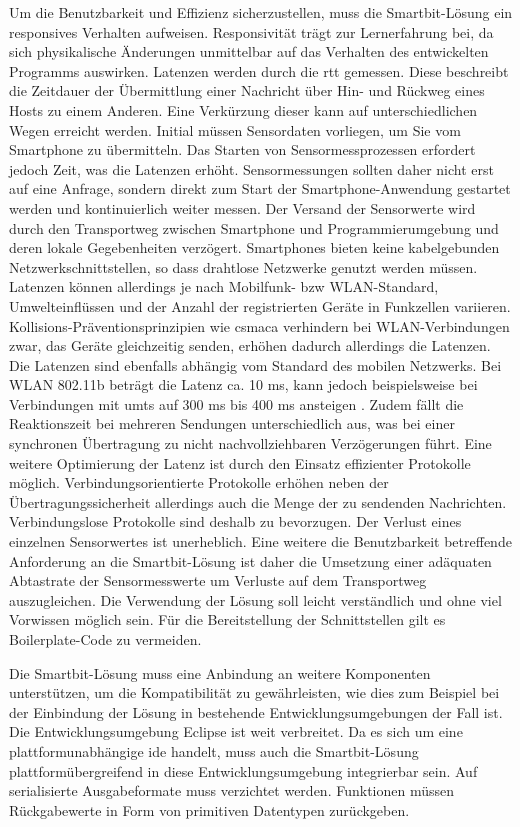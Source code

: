 \documentclass[11pt,a4paper]{report}
\begin{document}
Um die Benutzbarkeit und Effizienz sicherzustellen, muss die Smartbit-Lösung ein responsives Verhalten aufweisen.
Responsivität trägt zur Lernerfahrung bei, da sich physikalische Änderungen unmittelbar auf das Verhalten des entwickelten Programms auswirken.
Latenzen werden durch die \acrfull{rtt} gemessen.
Diese beschreibt die Zeitdauer der Übermittlung einer Nachricht über Hin- und Rückweg eines Hosts zu einem Anderen.
Eine Verkürzung dieser kann auf unterschiedlichen Wegen erreicht werden.
Initial müssen Sensordaten vorliegen, um Sie vom Smartphone zu übermitteln.
Das Starten von Sensormessprozessen erfordert jedoch Zeit, was die Latenzen erhöht. 
Sensormessungen sollten daher nicht erst auf eine Anfrage, sondern direkt zum Start der Smartphone-Anwendung  gestartet werden und kontinuierlich weiter messen.
Der Versand der Sensorwerte wird durch den Transportweg zwischen Smartphone und Programmierumgebung und deren lokale Gegebenheiten verzögert.
Smartphones bieten keine kabelgebunden Netzwerkschnittstellen, so dass drahtlose Netzwerke genutzt werden müssen.
Latenzen können allerdings je nach Mobilfunk- bzw WLAN-Standard, Umwelteinflüssen und der Anzahl der registrierten Geräte in Funkzellen variieren.
Kollisions-Präventionsprinzipien wie \acrfull{csmaca} verhindern bei WLAN-Verbindungen zwar, das Geräte gleichzeitig senden, erhöhen dadurch allerdings die Latenzen.
Die Latenzen sind ebenfalls abhängig vom Standard des mobilen Netzwerks.
Bei WLAN 802.11b beträgt die Latenz ca. 10 ms, kann jedoch beispielsweise bei Verbindungen mit \acrfull{umts} auf 300 ms bis 400 ms ansteigen \cite{network_latencies}.
Zudem fällt die Reaktionszeit bei mehreren Sendungen unterschiedlich aus, was bei einer synchronen Übertragung zu nicht nachvollziehbaren Verzögerungen führt.
Eine weitere Optimierung der Latenz ist durch den Einsatz effizienter Protokolle möglich.
Verbindungsorientierte Protokolle erhöhen neben der Übertragungssicherheit allerdings auch die Menge der zu sendenden Nachrichten.
Verbindungslose Protokolle sind deshalb zu bevorzugen.
Der Verlust eines einzelnen Sensorwertes ist unerheblich.
Eine weitere die Benutzbarkeit betreffende Anforderung an die Smartbit-Lösung ist daher die Umsetzung einer adäquaten Abtastrate der Sensormesswerte um Verluste auf dem Transportweg auszugleichen.
Die Verwendung der Lösung soll leicht verständlich und ohne viel Vorwissen möglich sein.
Für die Bereitstellung der Schnittstellen gilt es Boilerplate-Code zu vermeiden.

Die Smartbit-Lösung muss eine Anbindung an weitere Komponenten unterstützen, um die Kompatibilität zu gewährleisten, wie dies zum Beispiel bei der Einbindung der Lösung in bestehende Entwicklungsumgebungen der Fall ist.
Die Entwicklungsumgebung Eclipse ist weit verbreitet.
Da es sich um eine plattformunabhängige \acrfull{ide} handelt, muss auch die Smartbit-Lösung plattformübergreifend in diese Entwicklungsumgebung integrierbar sein.
Auf serialisierte Ausgabeformate muss verzichtet werden.
Funktionen müssen Rückgabewerte in Form von primitiven Datentypen zurückgeben.
\end{document}
